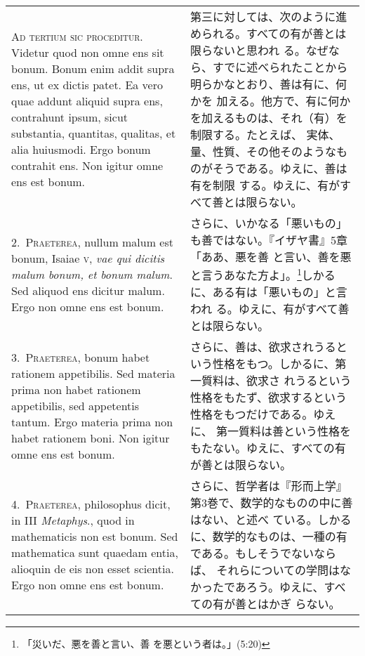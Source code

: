 \documentclass[10pt]{jsarticle} %
\begin{document}
\begin{longtable}{p{21em}p{21em}}



{\huge A}{\scshape d tertium sic proceditur}. Videtur quod non omne ens
 sit bonum. Bonum enim addit supra ens, ut ex dictis patet. Ea vero quae
 addunt aliquid supra ens, contrahunt ipsum, sicut substantia,
 quantitas, qualitas, et alia huiusmodi. Ergo bonum contrahit ens. Non
 igitur omne ens est bonum.

&

第三に対しては、次のように進められる。すべての有が善とは限らないと思われ
 る。なぜなら、すでに述べられたことから明らかなとおり、善は有に、何かを
 加える。他方で、有に何かを加えるものは、それ（有）を制限する。たとえば、
 実体、量、性質、その他そのようなものがそうである。ゆえに、善は有を制限
 する。ゆえに、有がすべて善とは限らない。


\\

2.~{\scshape Praeterea}, nullum malum est bonum, Isaiae {\scshape v},
 {\itshape vae qui dicitis malum bonum, et bonum malum}. Sed aliquod ens
 dicitur malum. Ergo non omne ens est bonum.

&

さらに、いかなる「悪いもの」も善ではない。『イザヤ書』5章「ああ、悪を善
 と言い、善を悪と言うあなた方よ」。\footnote{「災いだ、悪を善と言い、善
 を悪という者は。」(5:20)}しかるに、ある有は「悪いもの」と言われ
 る。ゆえに、有がすべて善とは限らない。

\\

3.~{\scshape Praeterea}, bonum habet rationem appetibilis. Sed materia
 prima non habet rationem appetibilis, sed appetentis tantum. Ergo
 materia prima non habet rationem boni. Non igitur omne ens est bonum.

&

さらに、善は、欲求されうるという性格をもつ。しかるに、第一質料は、欲求さ
 れうるという性格をもたず、欲求するという性格をもつだけである。ゆえに、
 第一質料は善という性格をもたない。ゆえに、すべての有が善とは限らない。

\\

4.~{\scshape Praeterea}, philosophus dicit, in III {\itshape Metaphys}.,
 quod in mathematicis non est bonum. Sed mathematica sunt quaedam entia,
 alioquin de eis non esset scientia. Ergo non omne ens est bonum.

&

さらに、哲学者は『形而上学』第3巻で、数学的なものの中に善はない、と述べ
 ている。しかるに、数学的なものは、一種の有である。もしそうでないならば、
 それらについての学問はなかったであろう。ゆえに、すべての有が善とはかぎ
 らない。


\end{longtable}
\end{document}
